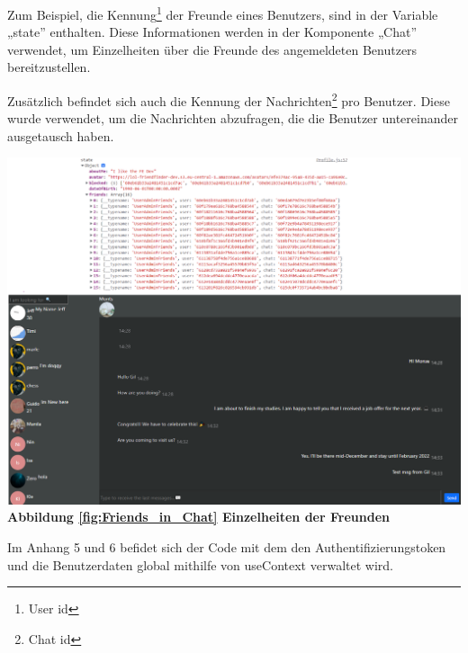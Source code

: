 Zum Beispiel, die Kennung\footnote{User id} der Freunde eines Benutzers, sind in der Variable „state” enthalten. Diese Informationen werden in der Komponente „Chat” verwendet, um Einzelheiten über die Freunde des angemeldeten Benutzers bereitzustellen.

Zusätzlich befindet sich auch die Kennung der Nachrichten\footnote{Chat id} pro Benutzer. Diese wurde verwendet, um die Nachrichten abzufragen, die die Benutzer untereinander ausgetausch haben.
\begin{center}
  \includegraphics[scale=0.45]
  {sources/Friends_in_Chat}\label{fig:Friends_in_Chat}\\
  \textbf{Abbildung \autoref{fig:Friends_in_Chat}
    Einzelheiten der Freunden}
\end{center}


Im Anhang 5 und 6 befidet sich der Code mit dem den Authentifizierungstoken und die Benutzerdaten global  mithilfe von useContext verwaltet wird.

